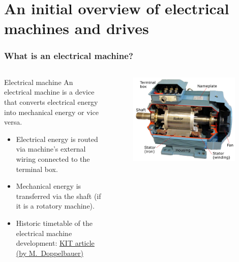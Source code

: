 \section{An initial overview of electrical machines and drives}

\begin{frame}
	\frametitle{What is an electrical machine?}
	\begin{columns}
		\begin{column}{0.5\textwidth}
			\begin{varblock}{Electrical machine}
				An electrical machine is a device that converts electrical energy into  mechanical energy or vice versa.
			\end{varblock}
			\vspace{0.25cm}
			\begin{itemize}
				\item<2-> Electrical energy is routed via machine's external wiring connected to the terminal box.
				\item<3-> Mechanical energy is transferred via the shaft (if it is a rotatory machine).
				\item<4-> Historic timetable of the electrical machine development: \href{https://www.eti.kit.edu/english/1376.php}{KIT article (by M.~Doppelbauer)}
			\end{itemize}
		\end{column}
		\begin{column}{0.5\textwidth}
			\begin{figure}
				\centering
				\includegraphics[width=0.95\textwidth]{fig/lec01/Induction_machine_opened.pdf}

\end{figure}
\end{column}
\end{columns}
\end{frame}
